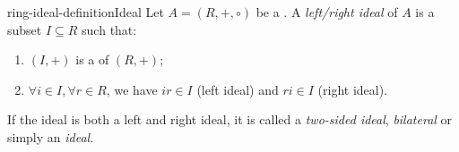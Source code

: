 \documentclass[preview]{standalone}
\begin{document}
\begin{snippetdefinition}{ring-ideal-definition}{Ideal}
    Let \(A = (R, +, \circ)\) be a \ring.
    A \emph{left/right ideal} of \(A\) is a subset \(I \subseteq R\)
    such that:
    \begin{enumerate}
        \item \((I, +)\) is a \subgroup of \((R, +)\);
        \item \(\forall i \in I, \forall r \in R\), we have \(ir \in I\) (left ideal) and \(ri \in I\) (right ideal).
    \end{enumerate}
    If the ideal is both a left and right ideal, it is called a
    \emph{two-sided ideal}, \emph{bilateral} or simply an \emph{ideal}.
\end{snippetdefinition}
\end{document}
